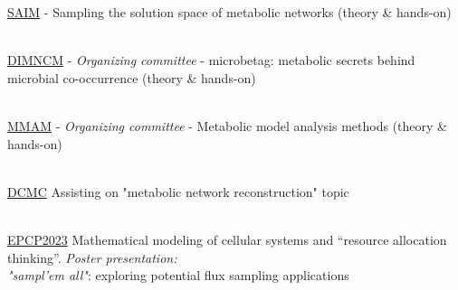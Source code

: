 \documentclass[
    a4paper,
]{../fortysecondscv}
\begin{document}

\begin{cvtable}
    
\end{cvtable}



\begin{cvtable}

        {\href{https://ai-microbiome-school.onrender.com/}{SAIM}}
        {
            - Sampling the solution space of metabolic networks (theory \& hands-on)
        }{}

    \\

        {\href{http://msysbiology.com/microbialdataintegration/}{DIMNCM}}
        {
            - \textit{Organizing committee}
            -  microbetag: metabolic secrets behind microbial co-occurrence (theory \& hands-on)
        }{}

    \\


        {\href{https://metabolicmodelingantony2025.onrender.com/}{MMAM}}
        {
            - \textit{Organizing committee}
            - Metabolic model analysis methods (theory \& hands-on)
        }{}

    \\
    
        {\href{http://msysbiology.com/microbedesign/}{DCMC}}
        {Assisting on "metabolic network reconstruction" topic}{}

    \\

        {\href{https://appliedhologenomicsconference.eu}{EPCP2023}}
        {Mathematical modeling of cellular systems and “resource allocation thinking”. 
        \textit{Poster presentation: \\ "sampl'em all"}: exploring potential flux sampling applications}{}
    \\
 

\end{cvtable}
\end{document}
